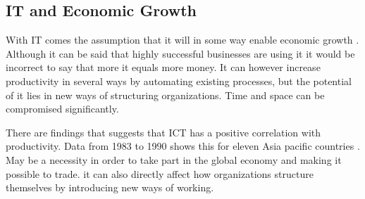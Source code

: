 \subsection{IT and Economic Growth}
With IT comes the assumption that it will in some way enable economic growth \cite{ca:ieeg}.
Although it can be said that highly successful businesses are using \gls{it} it would be incorrect to say that more \gls{it} equals more money.
It can however increase productivity in several ways by automating existing processes, but the potential of \gls{it} lies in new ways of structuring organizations.
Time and space can be compromised significantly.

There are findings that suggests that ICT has a positive correlation with productivity. Data from 1983 to 1990 shows this for eleven Asia pacific countries \cite{ca:ieeg}. 
May be a necessity in order to take part in the global economy and making it possible to trade. 
\gls{it} can also directly affect how organizations structure themselves by introducing new ways of working.

